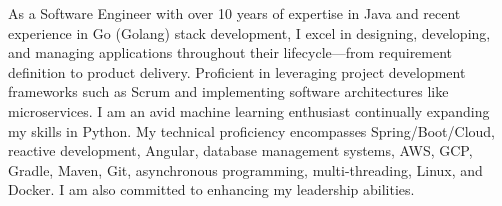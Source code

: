 

\begin{cvparagraph}

As a Software Engineer with over 10 years of expertise in Java and recent experience in Go (Golang) stack development, I excel in designing, developing, and managing applications throughout their lifecycle—from requirement definition to product delivery. Proficient in leveraging project development frameworks such as Scrum and implementing software architectures like microservices. I am an avid machine learning enthusiast continually expanding my skills in Python. My technical proficiency encompasses Spring/Boot/Cloud, reactive development, Angular, database management systems, AWS, GCP, Gradle, Maven, Git, asynchronous programming, multi-threading, Linux, and Docker. I am also committed to enhancing my leadership abilities.
\end{cvparagraph}
